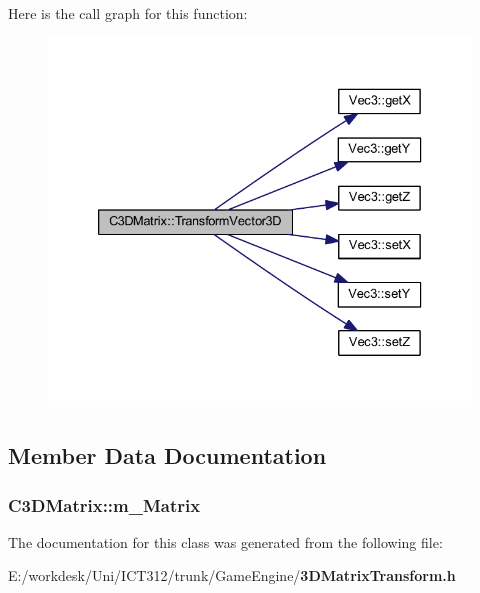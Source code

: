 Here is the call graph for this function\+:\nopagebreak
\begin{figure}[H]
\begin{center}
\leavevmode
\includegraphics[width=333pt]{d7/d7f/class_c3_d_matrix_aa1913cf0c0edd307f72f67bba050f0f4_cgraph}
\end{center}
\end{figure}




\subsection{Member Data Documentation}
\subsubsection[{m\+\_\+\+Matrix}]{ C3\+D\+Matrix\+::m\+\_\+\+Matrix\hspace{0.3cm}{\ttfamily [private]}}\label{class_c3_d_matrix_a1fd424471816d06c41f85885db7f36b9}


The documentation for this class was generated from the following file\+:\begin{DoxyCompactItemize}
\item 
E\+:/workdesk/\+Uni/\+I\+C\+T312/trunk/\+Game\+Engine/{\bf 3\+D\+Matrix\+Transform.\+h}\end{DoxyCompactItemize}
